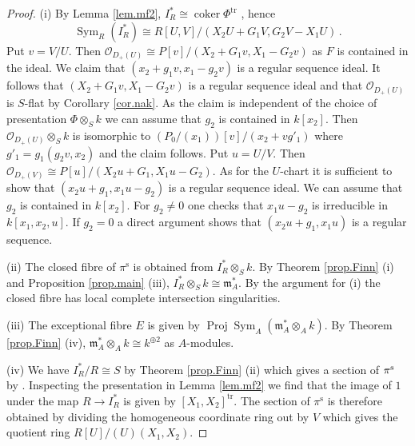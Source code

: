 \documentclass[a4paper,10pt]{amsart}
\theoremstyle{plain}
\theoremstyle{definition}
\theoremstyle{remark}
\numberwithin{equation}{xx}
\DeclareMathOperator{\coker}{coker}
\DeclareMathOperator{\Proj}{Proj}
\DeclareMathOperator{\Sym}{Sym}
\newcommand{\ra}{\rightarrow}
\newcommand{\ot}{{\otimes}}
\newcommand{\tn}{\textnormal}
\newcommand{\fr}[1]{\mathfrak{{#1}}}
\newcommand{\Q}{\mathcal{O}}
\begin{document}
\begin{proof}
(i) By Lemma \ref{lem.mf2}, \(I_{R}^{*}\cong\coker\Phi^{\text{tr}}\) , hence
\begin{equation}\label{eq.hom}
\Sym_{R}(I_{R}^{*})\cong R[U,V]/(X_{2}U+G_{1}V,G_{2}V-X_{1}U)\,.
\end{equation}
Put \(v=V/U\). Then \(\Q_{D_{+}(U)}\cong P[v]/(X_{2}+G_{1}v, X_{1}-G_{2}v)\) as \(F\) is contained in the ideal. We claim that \((x_{2}+g_{1}v,x_{1}-g_{2}v)\) is a regular sequence ideal. It follows that \((X_{2}+G_{1}v, X_{1}-G_{2}v)\) is a regular sequence ideal and that \(\Q_{D_{+}(U)}\) is \(S\)-flat by Corollary \ref{cor.nak}. As the claim is independent of the choice of presentation \(\Phi\ot_{S}k\) we can assume that \(g_{2}\) is contained in \(k[x_{2}]\). Then \(\Q_{D_{+}(U)}\ot_{S}k\) is isomorphic to \((P_{0}/(x_{1}))[v]/(x_{2}+vg'_{1})\) where \(g'_{1}=g_{1}(g_{2}v,x_{2})\) and the claim follows. Put \(u=U/V\). Then \(\Q_{D_{+}(V)}\cong P[u]/(X_{2}u+G_{1},X_{1}u-G_{2})\). As for the \(U\)-chart it is sufficient to show that \((x_{2}u+g_{1},x_{1}u-g_{2})\) is a regular sequence ideal. We can assume that \(g_{2}\) is contained in \(k[x_{2}]\). For \(g_{2}\neq0\) one checks that \(x_{1}u-g_{2}\) is irreducible in \(k[x_{1},x_{2},u]\). If \(g_{2}=0\) a direct argument shows that \((x_{2}u+g_{1},x_{1}u)\) is a regular sequence.

(ii) The closed fibre of \(\pi^{\text{s}}\) is obtained from \(I_{R}^{*}\ot_{S}k\). By Theorem \ref{prop.Finn} (i) and Proposition \ref{prop.main} (iii), \(I_{R}^{*}\ot_{S}k\cong \fr{m}_{A}^{*}\). By the argument for (i) the closed fibre has local complete intersection singularities. 

(iii) The exceptional fibre \(E\) is given by \(\Proj\Sym_{A}(\fr{m}_{A}^{*}\ot_{A}k)\). By Theorem \ref{prop.Finn} (iv), \(\fr{m}_{A}^{*}\ot_{A} k\cong k^{\oplus 2}\) as \(A\)-modules. 

(iv) We have \(I_{R}^{*}/R\cong S\) by Theorem \ref{prop.Finn} (ii) which gives a section of \(\pi^{\tn{s}}\) by \cite[4.2.3]{EGAII}. Inspecting the presentation in Lemma \ref{lem.mf2} we find that the image of \(1\) under the map \(R\ra I_{R}^{*}\) is given by \([X_{1},X_{2}]^{\text{tr}}\). The section of \(\pi^{\text{s}}\) is therefore obtained by dividing the homogeneous coordinate ring out by \(V\) which gives the quotient ring \(R[U]/(U)(X_{1},X_{2})\). 
\end{proof}
\end{document}
